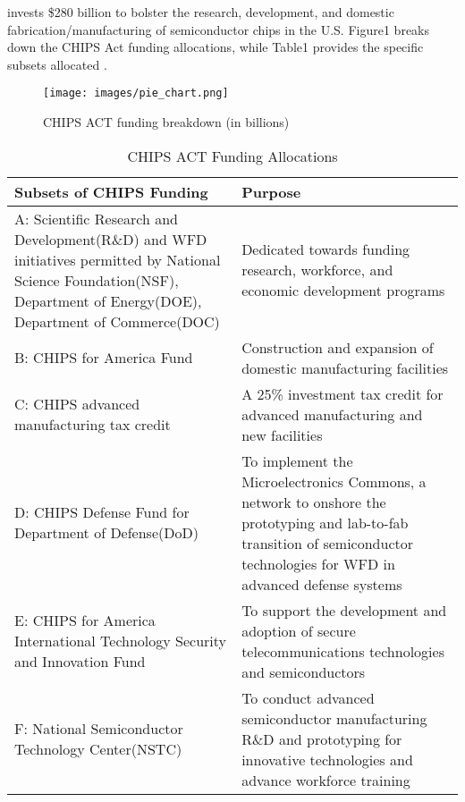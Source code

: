 invests \$280 billion to bolster the research, development, and domestic fabrication/manufacturing of semiconductor chips in the U.S. Figure1 breaks down the CHIPS Act funding allocations, while Table1 provides the specific subsets allocated \cite{Badlam2022,chips_act2022}.


\begin{figure}[!hbp]
    \texttt{[image: images/pie\_chart.png]}
    \caption{CHIPS ACT funding breakdown (in billions)}\label{fig:1}
\end{figure}

\begin{center}
\begin{table*}
\caption{CHIPS ACT Funding Allocations} \label{table-1}
\label{table:1}
{\renewcommand{\arraystretch}{2}%
\begin{tabularx}{0.99\textwidth}{|X|X|}
  \hline
  Subsets of CHIPS Funding & 
  Purpose\\
  \hline
  A: Scientific Research and Development(R\&D) and WFD initiatives permitted by National Science Foundation(NSF), Department of Energy(DOE), Department of Commerce(DOC) & 
  Dedicated towards funding research, workforce, and economic development programs\\
  \hline
  B: CHIPS for America Fund & 
  Construction and expansion of domestic manufacturing facilities\\
  \hline
  C: CHIPS advanced manufacturing tax credit & 
  A 25\% investment tax credit for advanced manufacturing and new facilities\\
  \hline
  D: CHIPS Defense Fund for Department of Defense(DoD) & 
  To implement the Microelectronics Commons, a network to onshore the prototyping and lab-to-fab transition of semiconductor technologies for WFD in advanced defense systems\\
  \hline
  E: CHIPS for America International Technology Security and Innovation Fund & 
  To support the development and adoption of secure telecommunications technologies and semiconductors\\
  \hline
  F: National Semiconductor Technology Center(NSTC) &
  To conduct advanced semiconductor manufacturing R\&D and prototyping for innovative technologies and advance workforce training\\

\end{tabularx}}
\end{table*}
\end{center}
